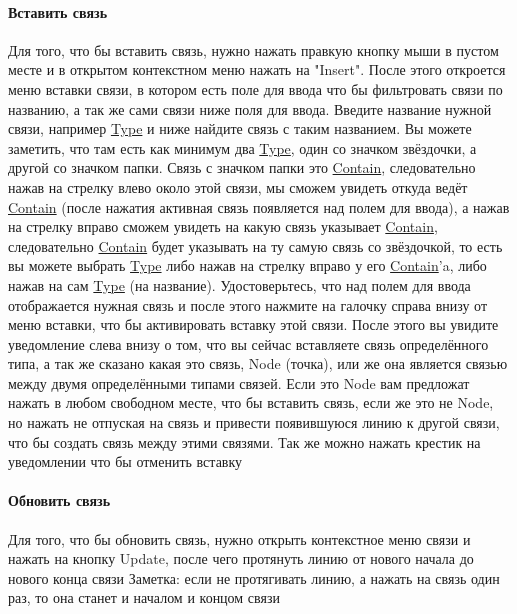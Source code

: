 \documentclass{article}
\begin{document}
\paragraph{Вставить связь}
Для того, что бы \hypertarget{DeepCase.InsertLink.Description}{вставить связь},
нужно
нажать правкую кнопку мыши в пустом
месте и в открытом контекстном меню нажать на "Insert". После этого откроется
меню вставки связи, в котором есть поле для ввода что бы фильтровать связи по
названию, а так же сами связи ниже поля для ввода. Введите название нужной
связи, например \hyperlink{Core.Type.Description}{Type} и ниже найдите связь с
таким
названием. Вы можете
заметить, что там есть как минимум два \hyperlink{Core.Type.Description}{Type},
один со
значком звёздочки, а
другой со значком папки. Связь с значком папки это
\hyperlink{Core.Contain.Description}{Contain}, следовательно нажав
на стрелку влево около этой связи, мы сможем увидеть откуда ведёт
\hyperlink{Core.Contain.Description}{Contain}
(после нажатия активная связь появляется над полем для ввода), а нажав на
стрелку вправо сможем увидеть на какую связь указывает
\hyperlink{Core.Contain.Description}{Contain}, следовательно
\hyperlink{Core.Contain.Description}{Contain} будет указывать на ту самую связь
со
звёздочкой, то есть вы можете
выбрать \hyperlink{Core.Type.Description}{Type} либо нажав на стрелку вправо у
его
\hyperlink{Core.Contain.Description}{Contain}'a, либо нажав на сам
\hyperlink{Core.Type.Description}{Type} (на название). Удостоверьтесь, что над
полем для
ввода отображается нужная
связь и после этого нажмите на галочку справа внизу от меню вставки, что бы
активировать вставку этой связи. После этого вы увидите уведомление слева внизу
о том, что вы сейчас вставляете связь определённого типа, а так же сказано
какая это связь, Node (точка), или же она является связью между двумя
определёнными типами связей. Если это Node вам предложат нажать в любом
свободном месте, что бы вставить связь, если же это не Node, но нажать не
отпуская на связь и привести появившуюся линию к другой связи, что бы создать
связь между этими связями. Так же можно нажать крестик на уведомлении что бы
отменить вставку
\paragraph{Обновить связь}
Для того, что бы обновить связь, нужно открыть контекстное меню связи и нажать
на кнопку Update, после чего протянуть линию от нового начала до нового конца
связи
Заметка: если не протягивать линию, а нажать на связь один раз, то она станет и
началом и концом связи
\end{document}
